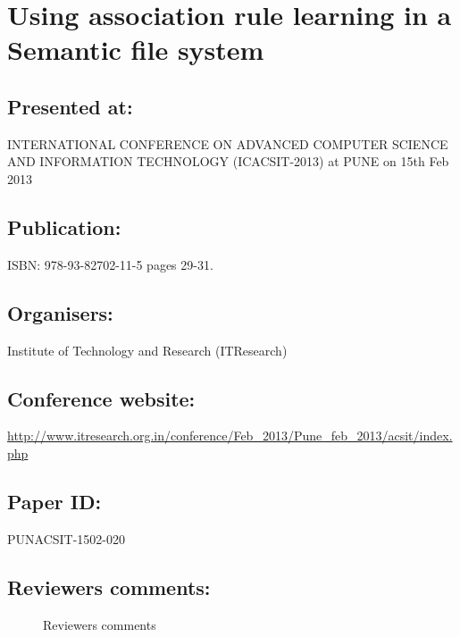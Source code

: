 \section{Using association rule learning in a Semantic file system}
\subsection{Presented at:} INTERNATIONAL CONFERENCE ON ADVANCED COMPUTER SCIENCE AND INFORMATION TECHNOLOGY (ICACSIT-2013) at PUNE on 15th Feb 2013
\subsection{Publication:} ISBN: 978-93-82702-11-5 pages 29-31.
\subsection{Organisers:} Institute of Technology and Research (ITResearch)
\subsection{Conference website:} \url{http://www.itresearch.org.in/conference/Feb_2013/Pune_feb_2013/acsit/index.php}
\hspace*{-1.5cm}
\subsection{Paper ID:} PUNACSIT-1502-020
\newpage
\subsection{Reviewers comments:}
\begin{figure}[htb]
\centering
\setlength\fboxsep{0pt}
\setlength\fboxrule{0.5pt}
\caption{Reviewers comments}
\label{fig:dfd0}
\end{figure}

